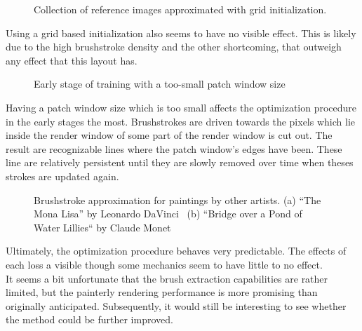 \begin{figure*}
    \caption[]{Collection of reference images approximated with grid initialization.}
\end{figure*}
Using a grid based initialization also seems to have no visible effect.
This is likely due to the high brushstroke density and the other shortcoming, that outweigh any effect that this layout has.

\begin{figure*}
    \caption[]{Early stage of training with a too-small patch window size}
\end{figure*}
Having a patch window size which is too small affects the optimization procedure in the early stages the most.
Brushstrokes are driven towards the pixels which lie inside the render window of some part of the render window is cut out.
The result are recognizable lines where the patch window's edges have been.
These line are relatively persistent until they are slowly removed over time when theses strokes are updated again. 

\begin{figure*}
    \caption[]{Brushstroke approximation for paintings by other artists. (a) ``The Mona Lisa'' by Leonardo DaVinci~\cite{monalisa} (b) ``Bridge over a Pond of Water Lillies`` by Claude Monet~\cite{bridge}}
\end{figure*}


Ultimately, the optimization procedure behaves very predictable.
The effects of each loss a visible though some mechanics seem to have little to no effect.\\
It seems a bit unfortunate that the brush extraction capabilities are rather limited, but the painterly rendering performance is more promising than originally anticipated.
Subsequently, it would still be interesting to see whether the method could be further improved.
